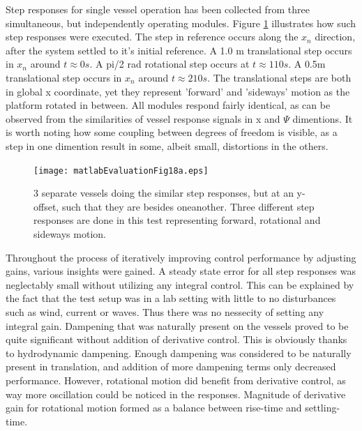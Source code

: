 Step responses for single vessel operation has been collected from three simultaneous, but independently operating modules. Figure \ref{stepXYYAW1example} illustrates how such step responses were executed. The step in reference occurs along the $x_{n}$ direction, after the system settled to it's initial reference. A 1.0 m translational step occurs in $x_n$ around $t\approx0s$. A pi/2 rad rotational step occurs at $t\approx110s$. A 0.5m translational step occurs in $x_n$ around $t\approx210s$. The translational steps are both in global x coordinate, yet they represent 'forward' and 'sideways' motion as the platform rotated in between. All modules respond fairly identical, as can be observed from the similarities of vessel response signals in x and $\Psi$ dimentions. It is worth noting how some coupling between degrees of freedom is visible, as a step in one dimention result in some, albeit small, distortions in the others. 

\begin{figure}[H]
	\centering
	\texttt{[image: matlabEvaluationFig18a.eps]}
	\caption{3 separate vessels doing the similar step responses, but at an y-offset, such that they are besides oneanother. Three different step responses are done in this test representing forward, rotational and sideways motion.}
	\label{stepXYYAW1example}
\end{figure}

Throughout the process of iteratively improving control performance by adjusting gains, various insights were gained. 
A steady state error for all step responses was neglectably small without utilizing any integral control. This can be explained by the fact that the test setup was in a lab setting with little to no disturbances such as wind, current or waves. Thus there was no nessecity of setting any integral gain.
Dampening that was naturally present on the vessels proved to be quite significant without addition of derivative control. This is obviously thanks to hydrodynamic dampening. Enough dampening was considered to be naturally present in translation, and addition of more dampening terms only decreased performance. However, rotational motion did benefit from derivative control, as way more oscillation could be noticed in the responses. Magnitude of derivative gain for rotational motion formed as a balance between rise-time and settling-time. 


